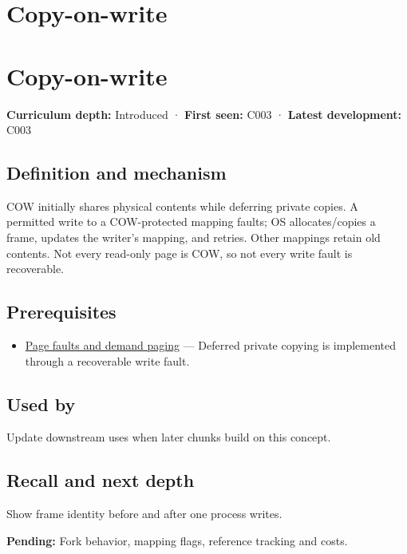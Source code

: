 \hypertarget{appendix-7a06e5baac04}{}
\section*{Copy-on-write}
\section{Copy-on-write}\label{copy-on-write}

\textbf{Curriculum depth:} Introduced · \textbf{First seen:} C003 · \textbf{Latest development:} C003

\subsection{Definition and mechanism}\label{definition-and-mechanism}

COW initially shares physical contents while deferring private copies. A permitted write to a COW-protected mapping faults; OS allocates/copies a frame, updates the writer's mapping, and retries. Other mappings retain old contents. Not every read-only page is COW, so not every write fault is recoverable.

\subsection{Prerequisites}\label{prerequisites}

\begin{itemize}
\tightlist
\item
  \hyperref[appendix-cc0909a7ef14]{Page faults and demand paging} --- Deferred private copying is implemented through a recoverable write fault.
\end{itemize}

\subsection{Used by}\label{used-by}

Update downstream uses when later chunks build on this concept.

\subsection{Recall and next depth}\label{recall-and-next-depth}

Show frame identity before and after one process writes.

\textbf{Pending:} Fork behavior, mapping flags, reference tracking and costs.


